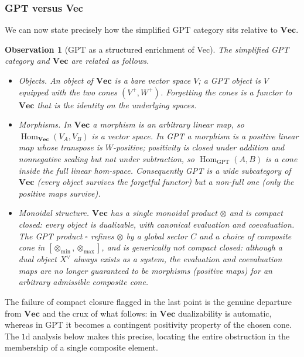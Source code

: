 \documentclass[prl,aps,10pt,superscriptaddress, floatfix]{revtex4-2}
\newtheorem{obs}{Observation}
\begin{document}
\subsubsection*{GPT versus Vec}

We can now state precisely how the simplified GPT category sits relative to $\mathbf{Vec}$.

\begin{obs}[GPT as a structured enrichment of Vec]\label{obs:gpt-vs-vec}
The simplified GPT category and $\mathbf{Vec}$ are related as follows.
\begin{itemize}
\item \emph{Objects.} An object of $\mathbf{Vec}$ is a bare vector space $V$; a GPT object is $V$ \emph{equipped with} the two cones $(V^+,W^+)$. Forgetting the cones is a functor to $\mathbf{Vec}$ that is the identity on the underlying spaces.
\item \emph{Morphisms.} In $\mathbf{Vec}$ a morphism is an \emph{arbitrary} linear map, so $\operatorname{Hom}_{\mathbf{Vec}}(V_A,V_B)$ is a vector space. In GPT a morphism is a \emph{positive} linear map whose transpose is $W$-positive; positivity is closed under addition and nonnegative scaling but not under subtraction, so $\operatorname{Hom}_{\mathrm{GPT}}(A,B)$ is a \emph{cone} inside the full linear hom-space. Consequently GPT is a \emph{wide} subcategory of $\mathbf{Vec}$ (every object survives the forgetful functor) but a \emph{non-full} one (only the positive maps survive).
\item \emph{Monoidal structure.} $\mathbf{Vec}$ has a single monoidal product $\otimes$ and \emph{is compact closed}: every object is dualizable, with canonical evaluation and coevaluation. The GPT product $\square$ refines $\otimes$ by a global sector $C$ and a choice of composite cone in $[\otimes_{\min},\otimes_{\max}]$, and is \emph{generically not compact closed}: although a dual object $X^\vee$ always exists as a system, the evaluation and coevaluation maps are no longer guaranteed to be \emph{morphisms} (positive maps) for an arbitrary admissible composite cone.
\end{itemize}
\end{obs}

The failure of compact closure flagged in the last point is the genuine departure from $\mathbf{Vec}$ and the crux of what follows: in $\mathbf{Vec}$ dualizability is automatic, whereas in GPT it becomes a contingent positivity property of the chosen cone. The $1$d analysis below makes this precise, locating the entire obstruction in the membership of a single composite element.
\end{document}
